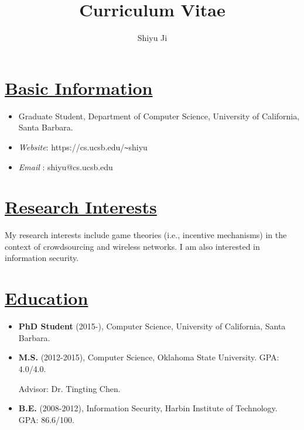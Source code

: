 \documentclass{article}
\newlength{\nL}
\newcommand{\underLineText}[1]{\settowidth{\nL}{#1}\setlength{\nL}{0.95\textwidth-\nL}\underline{{\sc #1}\hspace{\nL}}}
\begin{document}
\title{\bf Curriculum Vitae}
\author{Shiyu Ji}
\date{}
\maketitle

\section*{\underLineText{Basic Information}}
\begin{itemize}
\item Graduate Student, Department of Computer Science, University of California, Santa Barbara.
\item {\it Website}: https://cs.ucsb.edu/\verb+~+shiyu
\item {\it Email} \Letter: shiyu@cs.ucsb.edu
\end{itemize}

\section*{\underLineText{Research Interests}}
My research interests include game theories (i.e., incentive mechanisms) in the context of crowdsourcing and wireless networks. I am also interested in information security.

\section*{\underLineText{Education}}
\begin{itemize}
\item {\bf PhD Student} (2015-), Computer Science, University of California, Santa Barbara.

\item {\bf M.S.} (2012-2015), Computer Science, Oklahoma State University. GPA: 4.0/4.0.

Advisor: Dr. Tingting Chen.

\item {\bf B.E.} (2008-2012), Information Security, Harbin Institute of Technology. GPA: 86.6/100.
\end{itemize}
\end{document}
